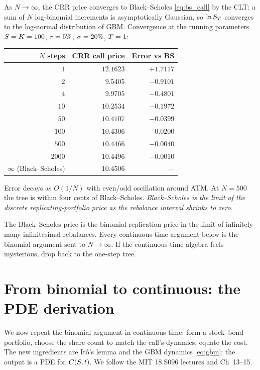 As $N \to \infty$, the CRR price converges to Black--Scholes
\eqref{eq:bs_call} by the CLT: a sum of $N$ log-binomial
increments is asymptotically Gaussian, so $\ln S_T$ converges
to the log-normal distribution of GBM. Convergence at the
running parameters $S = K = 100$, $r = 5\%$,
$\sigma = 20\%$, $T = 1$:

\begin{center}
\begin{tabular}{@{}rrr@{}}
\toprule
$N$ steps & CRR call price & Error vs BS \\
\midrule
$1$    & $12.1623$ & $+1.7117$ \\
$2$    & $9.5405$  & $-0.9101$ \\
$4$    & $9.9705$  & $-0.4801$ \\
$10$   & $10.2534$ & $-0.1972$ \\
$50$   & $10.4107$ & $-0.0399$ \\
$100$  & $10.4306$ & $-0.0200$ \\
$500$  & $10.4466$ & $-0.0040$ \\
$2000$ & $10.4496$ & $-0.0010$ \\
\midrule
$\infty$ (Black--Scholes) & $\mathbf{10.4506}$ & --- \\
\bottomrule
\end{tabular}
\end{center}

Error decays as $O(1/N)$ with even/odd oscillation around ATM.
At $N = 500$ the tree is within four cents of Black--Scholes.
\emph{Black--Scholes is the limit of the discrete
replicating-portfolio price as the rebalance interval shrinks
to zero.}

\begin{intuitionbox}
The Black--Scholes price is the binomial replication price in
the limit of infinitely many infinitesimal rebalances. Every
continuous-time argument below is the binomial argument sent to
$N \to \infty$. If the continuous-time algebra feels mysterious,
drop back to the one-step tree.
\end{intuitionbox}

\section{From binomial to continuous: the PDE derivation}
\label{sec:ch15_pde}

We now repeat the binomial argument in continuous time: form a
stock--bond portfolio, choose the share count to match the call's
dynamics, equate the cost. The new ingredients are It\^o's lemma
and the GBM dynamics \eqref{eq:gbm}; the output is a PDE for
$C(S, t)$. We follow the MIT 18.S096 lectures
\citep{mit18S096} and \citeHull{} Ch~13--15.

